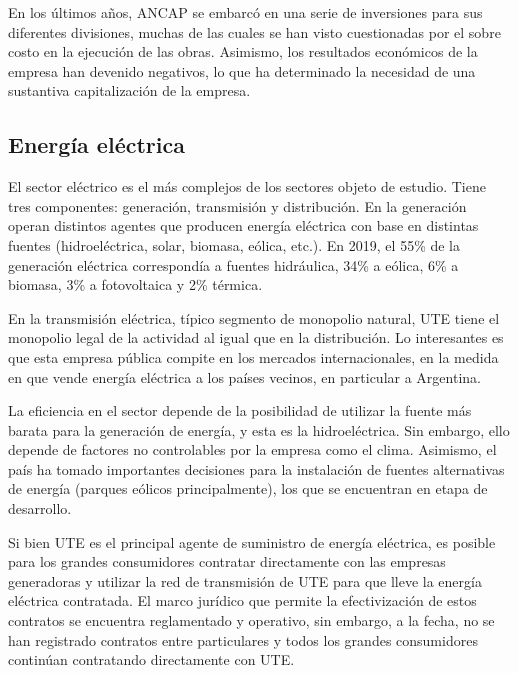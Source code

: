 \documentclass[
  12pt,
  spanish,
]{book}
\begin{document}
En los últimos años, ANCAP se embarcó en una serie de inversiones para
sus diferentes divisiones, muchas de las cuales se han visto
cuestionadas por el sobre costo en la ejecución de las obras. Asimismo,
los resultados económicos de la empresa han devenido negativos, lo que
ha determinado la necesidad de una sustantiva capitalización de la
empresa.

\hypertarget{energuxeda-eluxe9ctrica}{%
\subsection{Energía eléctrica}\label{energuxeda-eluxe9ctrica}}

El sector eléctrico es el más complejos de los sectores objeto de
estudio. Tiene tres componentes: generación, transmisión y distribución.
En la generación operan distintos agentes que producen energía eléctrica
con base en distintas fuentes (hidroeléctrica, solar, biomasa, eólica,
etc.). En 2019, el 55\% de la generación eléctrica correspondía a
fuentes hidráulica, 34\% a eólica, 6\% a biomasa, 3\% a fotovoltaica y
2\% térmica.

En la transmisión eléctrica, típico segmento de monopolio natural, UTE
tiene el monopolio legal de la actividad al igual que en la
distribución. Lo interesantes es que esta empresa pública compite en los
mercados internacionales, en la medida en que vende energía eléctrica a
los países vecinos, en particular a Argentina.

La eficiencia en el sector depende de la posibilidad de utilizar la
fuente más barata para la generación de energía, y esta es la
hidroeléctrica. Sin embargo, ello depende de factores no controlables
por la empresa como el clima. Asimismo, el país ha tomado importantes
decisiones para la instalación de fuentes alternativas de energía
(parques eólicos principalmente), los que se encuentran en etapa de
desarrollo.

Si bien UTE es el principal agente de suministro de energía eléctrica,
es posible para los grandes consumidores contratar directamente con las
empresas generadoras y utilizar la red de transmisión de UTE para que
lleve la energía eléctrica contratada. El marco jurídico que permite la
efectivización de estos contratos se encuentra reglamentado y operativo,
sin embargo, a la fecha, no se han registrado contratos entre
particulares y todos los grandes consumidores continúan contratando
directamente con UTE.
\end{document}
